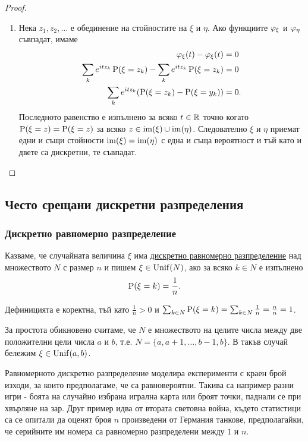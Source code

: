 \documentclass[numbers=endperiod, DIV=15, bibliography=totocnumbered]{scrartcl}
\begin{document}
\begin{proof}
\begin{enumerate}
    \item Нека $z_1, z_2, \ldots$ е обединение на стойностите на $\xi$ и $\eta$. Ако функциите $\varphi_\xi$ и $\varphi_\eta$ съвпадат, имаме
    \begin{align*}
      \varphi_\xi(t) - \varphi_\xi(t) &= 0
      \\
      \sum_k e^{i t z_k} \operatorname{P}(\xi = z_k) - \sum_k e^{i t z_k} \operatorname{P}(\xi = z_k) &= 0
      \\
      \sum_k e^{i t z_k} (\operatorname{P}(\xi = z_k) - \operatorname{P}(\xi = y_k)) &= 0.
    \end{align*}
    Последното равенство е изпълнено за всяко $t \in \mathbb{R}$ точно когато $\operatorname{P}(\xi = z) = \operatorname{P}(\xi = z)$ за всяко $z \in \operatorname{im}(\xi) \cup \operatorname{im}(\eta)$. Следователно $\xi$ и $\eta$ приемат едни и същи стойности $\operatorname{im}(\xi) = \operatorname{im}(\eta)$ с една и съща вероятност и тъй като и двете са дискретни, те съвпадат.
  \end{enumerate}
\end{proof}

\subsection{Често срещани дискретни разпределения}

\subsubsection{Дискретно равномерно разпределение}\label{dist:unif}

\begin{definition}
  Казваме, че случайната величина $\xi$ има \uline{дискретно равномерно разпределение} над множеството $N$ с размер $n$ и пишем $\xi \in \operatorname{Unif}(N)$, ако за всяко $k \in N$ е изпълнено
  \begin{displaymath}
    \operatorname{P}(\xi = k) = \frac 1 n.
  \end{displaymath}

  Дефиницията е коректна, тъй като $\frac 1 n > 0$ и $\sum_{k \in N} \operatorname{P}(\xi = k) = \sum_{k \in N} \frac 1 n = \frac n n = 1$.

  За простота обикновено считаме, че $N$ е множеството на целите числа между две положителни цели числа $a$ и $b$, т.е. $N = \{ a, a + 1, \ldots, b - 1, b \}$. В такъв случай бележим $\xi \in \operatorname{Unif}(a, b)$.
\end{definition}

Равномерното дискретно разпределение моделира експерименти с краен брой изходи, за които предполагаме, че са равновероятни. Такива са например разни игри - боята на случайно избрана игрална карта или броят точки, паднали се при хвърляне на зар. Друг пример идва от втората световна война, където статистици са се опитали да оценят броя $n$ произведени от Германия танкове, предполагайки, че серийните им номера са равномерно разпределени между $1$ и $n$.
\end{document}
